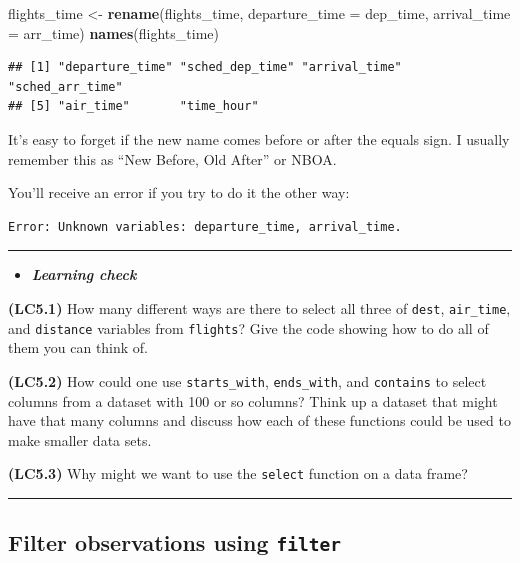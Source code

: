 \documentclass[]{tufte-book}
\newenvironment{Shaded}{\begin{snugshade}}{\end{snugshade}}
\newcommand{\KeywordTok}[1]{\textcolor[rgb]{0.13,0.29,0.53}{\textbf{{#1}}}}
\newcommand{\DataTypeTok}[1]{\textcolor[rgb]{0.13,0.29,0.53}{{#1}}}
\newcommand{\StringTok}[1]{\textcolor[rgb]{0.31,0.60,0.02}{{#1}}}
\newcommand{\NormalTok}[1]{{#1}}
\let\oldrule=\rule
\renewcommand{\rule}[1]{\oldrule{\linewidth}}
\newenvironment{rmdblock}[1]
  {\begin{shaded*}
  \begin{itemize}
  \renewcommand{\labelitemi}{
    \raisebox{-.7\height}[0pt][0pt]{
    }
  }
  \item
  }
  {
  \end{itemize}
  \end{shaded*}
  }
\newenvironment{learncheck}
  {\begin{rmdblock}{warning}}
  {\end{rmdblock}}
\begin{document}
\begin{Shaded}
\begin{Highlighting}[]
\NormalTok{flights_time <-}\StringTok{ }\KeywordTok{rename}\NormalTok{(flights_time,}
                       \DataTypeTok{departure_time =} \NormalTok{dep_time,}
                       \DataTypeTok{arrival_time =} \NormalTok{arr_time)}
\KeywordTok{names}\NormalTok{(flights_time)}
\end{Highlighting}
\end{Shaded}

\begin{verbatim}
## [1] "departure_time" "sched_dep_time" "arrival_time"   "sched_arr_time"
## [5] "air_time"       "time_hour"
\end{verbatim}

It's easy to forget if the new name comes before or after the equals
sign. I usually remember this as ``New Before, Old After'' or NBOA.

You'll receive an error if you try to do it the other way:

\begin{verbatim}
Error: Unknown variables: departure_time, arrival_time.
\end{verbatim}

\begin{center}\rule{0.5\linewidth}{\linethickness}\end{center}

\begin{learncheck}
\textbf{\emph{Learning check}}
\end{learncheck}

\textbf{(LC5.1)} How many different ways are there to select all three
of \texttt{dest}, \texttt{air\_time}, and \texttt{distance} variables
from \texttt{flights}? Give the code showing how to do all of them you
can think of.

\textbf{(LC5.2)} How could one use \texttt{starts\_with},
\texttt{ends\_with}, and \texttt{contains} to select columns from a
dataset with 100 or so columns? Think up a dataset that might have that
many columns and discuss how each of these functions could be used to
make smaller data sets.

\textbf{(LC5.3)} Why might we want to use the \texttt{select} function
on a data frame?

\begin{center}\rule{0.5\linewidth}{\linethickness}\end{center}

\subsection{\texorpdfstring{Filter observations using
\texttt{filter}}{Filter observations using filter}}\label{filter-observations-using-filter}
\end{document}
